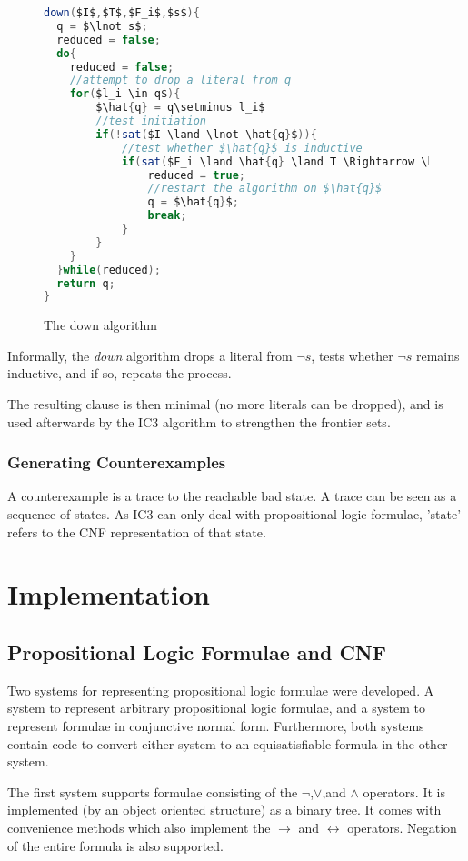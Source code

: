 \documentclass[a4paper]{article}
\begin{document}
\begin{figure}
\centering
\begin{lstlisting}[mathescape,language=Java]
down($I$,$T$,$F_i$,$s$){
  q = $\lnot s$;
  reduced = false;
  do{
  	reduced = false;
  	//attempt to drop a literal from q
  	for($l_i \in q$){
	  	$\hat{q} = q\setminus l_i$ 
	  	//test initiation
	  	if(!sat($I \land \lnot \hat{q}$)){
	  		//test whether $\hat{q}$ is inductive
	  		if(sat($F_i \land \hat{q} \land T \Rightarrow \hat{q}'$)){
	  			reduced = true;
	  			//restart the algorithm on $\hat{q}$
	  			q = $\hat{q}$;
	  			break;
			}	  		
	  	}
  	}
  }while(reduced);
  return q;
}
\end{lstlisting}
\caption{The down algorithm}
\label{fig:down}
\end{figure}

Informally, the \emph{down} algorithm drops a literal from $\lnot s$, tests whether $\lnot s$ remains inductive, and if so, repeats the process.

The resulting clause is then minimal (no more literals can be dropped), and is used afterwards by the IC3 algorithm to strengthen the frontier sets.

\subsubsection{Generating Counterexamples}
A counterexample is a trace to the reachable bad state. A trace can be seen as a sequence of states. As IC3 can only deal with propositional logic formulae, 'state' refers to the CNF representation of that state.

\section{Implementation}
\subsection{Propositional Logic Formulae and CNF}
Two systems for representing propositional logic formulae were developed. A system to represent arbitrary propositional logic formulae, and a system to represent formulae in conjunctive normal form. Furthermore, both systems contain code to convert either system to an equisatisfiable formula in the other system.

The first system supports formulae consisting of the $\lnot$,$\lor$,and $\land$ operators. It is implemented (by an object oriented structure) as a binary tree. It comes with convenience methods which also implement the $\rightarrow$ and $\leftrightarrow$ operators. Negation of the entire formula is also supported.
\end{document}
